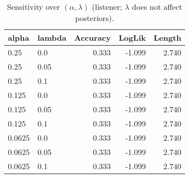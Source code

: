 \begin{table}[!htbp]\centering\small
\caption{Sensitivity over $(\alpha,\lambda)$ (listener; $\lambda$ does not affect posteriors).}\label{tab:table2}
\begin{tabular}{l l r r r}\toprule
alpha & lambda & Accuracy & LogLik & Length \\
\midrule
0.25 & 0.0 & 0.333 & -1.099 & 2.740 \\
0.25 & 0.05 & 0.333 & -1.099 & 2.740 \\
0.25 & 0.1 & 0.333 & -1.099 & 2.740 \\
0.125 & 0.0 & 0.333 & -1.099 & 2.740 \\
0.125 & 0.05 & 0.333 & -1.099 & 2.740 \\
0.125 & 0.1 & 0.333 & -1.099 & 2.740 \\
0.0625 & 0.0 & 0.333 & -1.099 & 2.740 \\
0.0625 & 0.05 & 0.333 & -1.099 & 2.740 \\
0.0625 & 0.1 & 0.333 & -1.099 & 2.740 \\
\bottomrule\end{tabular}\end{table}
